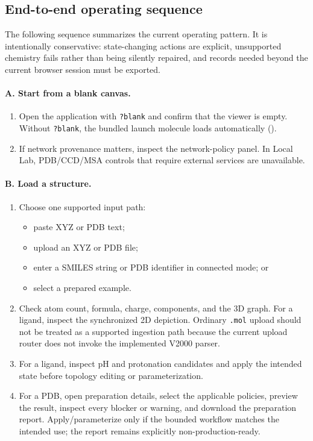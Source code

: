 \documentclass[11pt]{article}
\begin{document}
\begin{small}
\subsection{End-to-end operating sequence}\label{appB:sec23}

The following sequence summarizes the current operating pattern. It is intentionally conservative: state-changing actions are explicit, unsupported chemistry fails rather than being silently repaired, and records needed beyond the current browser session must be exported.

\paragraph{A. Start from a blank canvas.}
\begin{enumerate}[leftmargin=*]
\item Open the application with \texttt{?blank} and confirm that the viewer is empty. Without \texttt{?blank}, the bundled launch molecule loads automatically ().
\item If network provenance matters, inspect the network-policy panel. In Local Lab, PDB/CCD/MSA controls that require external services are unavailable.
\end{enumerate}

\paragraph{B. Load a structure.}
\begin{enumerate}[leftmargin=*]
\item Choose one supported input path:
  \begin{itemize}
  \item paste XYZ or PDB text;
  \item upload an XYZ or PDB file;
  \item enter a SMILES string or PDB identifier in connected mode; or
  \item select a prepared example.
  \end{itemize}
\item Check atom count, formula, charge, components, and the 3D graph. For a ligand, inspect the synchronized 2D depiction. Ordinary \texttt{.mol} upload should not be treated as a supported ingestion path because the current upload router does not invoke the implemented V2000 parser.
\item For a ligand, inspect pH and protonation candidates and apply the intended state before topology editing or parameterization.
\item For a PDB, open preparation details, select the applicable policies, preview the result, inspect every blocker or warning, and download the preparation report. Apply/parameterize only if the bounded workflow matches the intended use; the report remains explicitly non-production-ready.
\end{enumerate}


\end{small}
\end{document}
